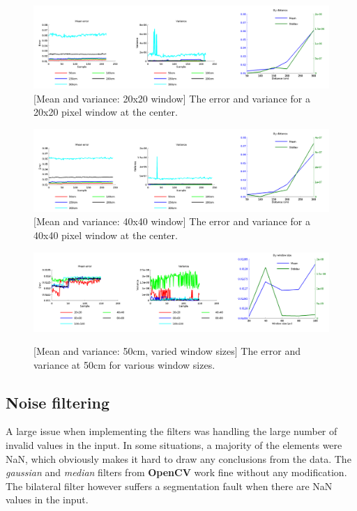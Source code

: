 \documentclass[11pt]{article}
\begin{document}
  
  \begin{figure}[ht]
    \centering
    \includegraphics[width=1\textwidth]{figures/20x20-plot.png}
    [Mean and variance: 20x20 window]{\label{fig:20x20} The error and variance for a 20x20 pixel window at the center.}
  \end{figure}
  \begin{figure}[ht]
    \centering
    \includegraphics[width=1\textwidth]{figures/plot40x40.png}
    [Mean and variance: 40x40 window]{\label{fig:40x40} The error and variance for a 40x40 pixel window at the center.}
  \end{figure}
  \begin{figure}[ht]
    \centering
    \includegraphics[width=1\textwidth]{figures/plotwindowsizes.png}
    
    [Mean and variance: 50cm, varied window sizes]{\label{fig:variedwindow} The error and variance at 50cm for various window sizes.}
  \end{figure}

  \subsection{Noise filtering}

  A large issue when implementing the filters was handling the large number of invalid values in the input. In some situations, a majority of the elements were NaN, which obviously makes it hard to draw any conclusions from the data. The \emph{gaussian} and \emph{median} filters from \textbf{OpenCV} work fine  without any modification. The bilateral filter however suffers a segmentation fault when there are NaN values in the input. \par
\end{document}
